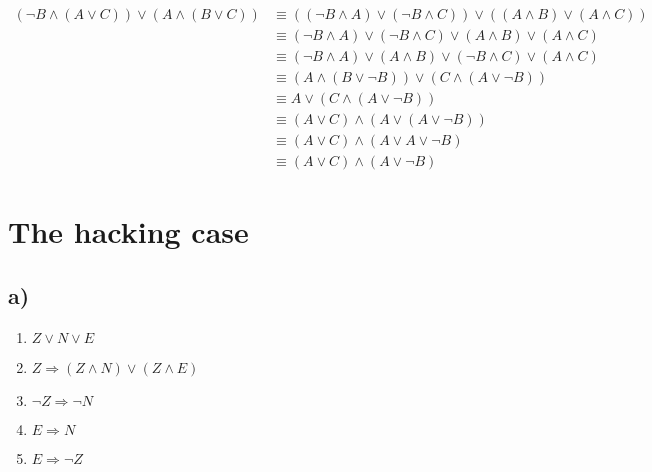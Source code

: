 \documentclass[a4paper]{article}
\begin{document}
\begin{itemize}
		\begin{align*}
			(\neg B \land (A \lor C)) \lor (A \land (B \lor C)) 
			&\equiv ((\neg B \land A) \lor (\neg B \land C)) \lor ((A \land B) \lor (A \land C)) \\
			&\equiv (\neg B \land A) \lor (\neg B \land C) \lor (A \land B) \lor (A \land C) \\
			&\equiv (\neg B \land A) \lor (A \land B) \lor (\neg B \land C) \lor  (A \land C) \\
			&\equiv (A \land (B \lor \neg B)) \lor (C \land (A \lor \neg B))\\
			&\equiv A \lor (C \land (A \lor \neg B)) \\
			&\equiv (A \lor C)  \land (A \lor (A \lor \neg B))\\
			&\equiv (A \lor C) \land  (A \lor A \lor \neg B)\\
			&\equiv (A \lor C) \land (A \lor \neg B)
		\end{align*}
\end{itemize}
\section{The hacking case}
	\subsection*{a)}
		\begin{enumerate}
			\item $Z \lor N \lor E$
			\item $Z  \Rightarrow (Z \land N) \lor (Z \land E)$
			\item $\neg Z \Rightarrow \neg N$
			\item $E \Rightarrow N$
			\item $E \Rightarrow \neg Z$
		\end{enumerate}
\end{document}
